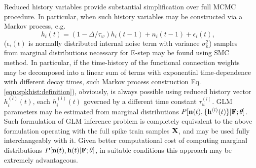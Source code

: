Reduced history variables provide substantial simplification over full MCMC procedure. In particular, when such history variables may be constructed via a Markov process, e.g.
\begin{equation}\label{eqn:spkhist:definition}
h_i(t)=(1-\Delta/\tau_w) h_i(t-1) + n_i(t-1) + \epsilon_i(t), 
\end{equation}
($\epsilon_i(t)$ is normally distributed internal noise term with variance $\sigma^2_h$) samples from marginal distributions necessary for E-step may be found using SMC method. In particular, if the time-history of the  functional connection weights may be decomposed into a linear sum of  terms with exponential time-dependence with different decay times, such Markov process construction Eq. \eqref{eqn:spkhist:definition}), obviously, is always possible using reduced history vector $h_i^{(l)}(t)$, each $h_i^{(l)}(t)$ governed by a different time constant $\tau^{(l)}_w$. GLM parameters may be estimated from marginal distributions $P[{\bf n}(t), \{{\bf h}^{(l)}(t)\}|{\bf F};\mathbf{\theta}]$.  Such formulation of GLM inference problem is completely equivalent to the above formulation operating with the full spike train samples ${\bf X}$, and may be used fully interchangeably with it. Given better computational cost of computing marginal distributions $P[{\bf n}(t), {\bf h}(t)|{\bf F};\mathbf{\theta}]$, in suitable conditions this approach may be extremely advantageous. 

